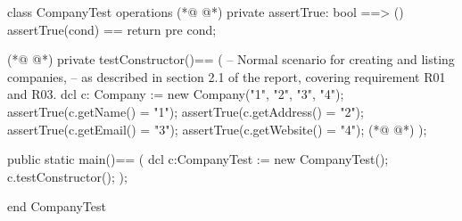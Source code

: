 \begin{vdmpp}[breaklines=true]
class CompanyTest
 operations
(*@
\label{assertTrue:3}
@*)
  private assertTrue: bool ==> ()
    assertTrue(cond) == return
    pre cond;
    
(*@
\label{testConstructor:7}
@*)
  private testConstructor()==
  (
   -- Normal scenario for creating and listing companies,
     -- as described in section 2.1 of the report, covering requirement R01 and R03.
   dcl c: Company := new Company("1", "2", "3", "4");
   assertTrue(c.getName() = "1");
   assertTrue(c.getAddress() = "2");
   assertTrue(c.getEmail() = "3");
   assertTrue(c.getWebsite() = "4");
(*@
\label{main:16}
@*)
  );
 
  public static main()==
    (
   dcl c:CompanyTest := new CompanyTest();
   c.testConstructor();
    );

end CompanyTest
\end{vdmpp}
